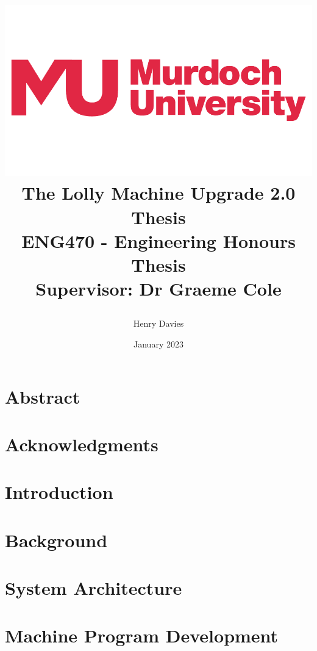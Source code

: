 \documentclass[oneside]{book}
\title  {\begin{center}
            \includegraphics[scale = 0.2]{murdochLogo} 
            \vspace{10mm}
            \\{\Huge The Lolly Machine Upgrade 2.0}
            \vspace{10mm}
            \\{\Huge Thesis}
            \vspace{20mm}
            \\{\Large ENG470 - Engineering Honours Thesis}
            \vspace{90mm}
            \\Supervisor: Dr Graeme Cole
            
        \end{center}}
\author{Henry Davies}
\date{January 2023}
\begin{document}
\frontmatter

\maketitle

\chapter*{Abstract}

\flushbottom

\chapter*{Acknowledgments}



\tableofcontents
{}
\newpage

\listoffigures
{}
\newpage

\printglossary[type=\acronymtype]
\newpage

\mainmatter
\pagestyle{plain}

\chapter{Introduction}
    \label{chap:intro}
    
    \newpage

\chapter{Background}
    \label{chap:background}
    
    \newpage

\chapter{System Architecture}
    \label{chap:sysArch}
    
    \newpage
    
\chapter{Machine Program Development}
    \label{chap:plc}
    
    \newpage  
    
\end{document}
